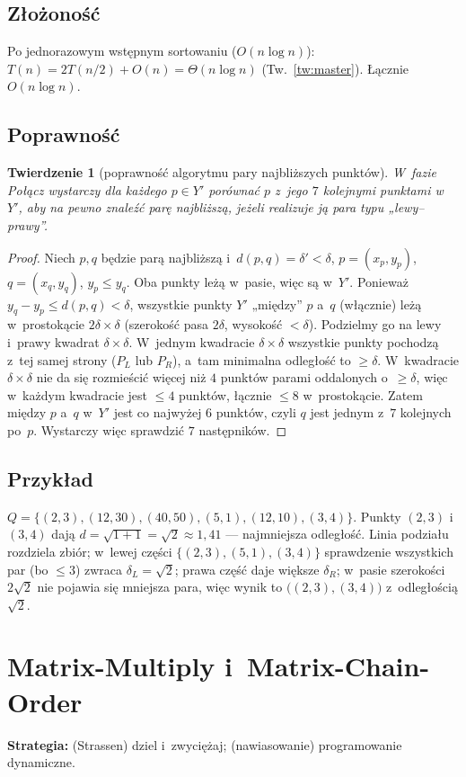 \documentclass[11pt,a4paper]{article}
\theoremstyle{plain}
\newtheorem{twierdzenie}{Twierdzenie}[section]
\theoremstyle{definition}
\begin{document}
\subsection*{Złożoność}
Po jednorazowym wstępnym sortowaniu ($O(n\log n)$): $T(n)=2T(n/2)+O(n)=\Theta(n\log n)$
(Tw.~\ref{tw:master}). Łącznie $O(n\log n)$.

\subsection*{Poprawność}
\begin{twierdzenie}[poprawność algorytmu pary najbliższych punktów]\label{tw:closest}
W~fazie Połącz wystarczy dla każdego $p\in Y'$ porównać $p$ z~jego $7$ kolejnymi punktami w~$Y'$,
aby na pewno znaleźć parę najbliższą, jeżeli realizuje ją para typu „lewy--prawy''.
\end{twierdzenie}
\begin{proof}
Niech $p,q$ będzie parą najbliższą i~$d(p,q)=\delta'<\delta$, $p=(x_p,y_p)$, $q=(x_q,y_q)$, $y_p\le y_q$.
Oba punkty leżą w~pasie, więc są w~$Y'$. Ponieważ
$y_q-y_p\le d(p,q)<\delta$, wszystkie punkty $Y'$ „między'' $p$ a~$q$ (włącznie) leżą w~prostokącie
$2\delta\times\delta$ (szerokość pasa $2\delta$, wysokość $<\delta$). Podzielmy go na lewy i~prawy
kwadrat $\delta\times\delta$. W~jednym kwadracie $\delta\times\delta$ wszystkie punkty pochodzą z~tej
samej strony ($P_L$ lub $P_R$), a~tam minimalna odległość to $\ge\delta$. W~kwadracie $\delta\times\delta$
nie da się rozmieścić więcej niż $4$ punktów parami oddalonych o~$\ge\delta$, więc w~każdym kwadracie
jest $\le 4$ punktów, łącznie $\le 8$ w~prostokącie. Zatem między $p$ a~$q$ w~$Y'$ jest co najwyżej $6$
punktów, czyli $q$ jest jednym z~$7$ kolejnych po~$p$. Wystarczy więc sprawdzić $7$ następników.
\end{proof}

\subsection*{Przykład}
$Q=\{(2,3),(12,30),(40,50),(5,1),(12,10),(3,4)\}$. Punkty $(2,3)$ i~$(3,4)$ dają
$d=\sqrt{1+1}=\sqrt2\approx1{,}41$ --- najmniejsza odległość. Linia podziału rozdziela zbiór; w~lewej
części $\{(2,3),(5,1),(3,4)\}$ sprawdzenie wszystkich par (bo $\le3$) zwraca $\delta_L=\sqrt2$; prawa
część daje większe $\delta_R$; w~pasie szerokości $2\sqrt2$ nie pojawia się mniejsza para, więc wynik
to $\big((2,3),(3,4)\big)$ z~odległością $\sqrt2$.

\section{Matrix-Multiply i~Matrix-Chain-Order}\label{sec:matrix}
\textbf{Strategia:} (Strassen) dziel i~zwyciężaj; (nawiasowanie) programowanie dynamiczne.
\end{document}
